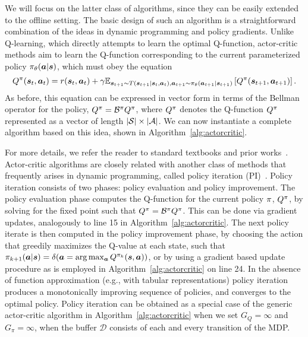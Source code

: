 \documentclass[../thesis.tex]{subfiles}
\begin{document}
We will focus on the latter class of algorithms, since they can be easily extended to the offline setting. The basic design of such an algorithm is a straightforward combination of the ideas in dynamic programming and policy gradients. Unlike Q-learning, which directly attempts to learn the optimal Q-function, actor-critic methods aim to learn the Q-function corresponding to the current parameterized policy $\pi_\theta(\boldsymbol{a} | \boldsymbol{s})$, which must obey the equation
\[
Q^\pi(\boldsymbol{s}_t, \boldsymbol{a}_t) = r(\boldsymbol{s}_t,\boldsymbol{a}_t) + \gamma \mathbb{E}_{\boldsymbol{s}_{t+1} \sim T(\boldsymbol{s}_{t+1}|\boldsymbol{s}_t,\boldsymbol{a}_t), \boldsymbol{a}_{t+1} \sim \pi_\theta(\boldsymbol{a}_{t+1} | \boldsymbol{s}_{t+1})}\left[
Q^\pi(\boldsymbol{s}_{t+1},\boldsymbol{a}_{t+1})
\right].
\]
As before, this equation can be expressed in vector form in terms of the Bellman operator for the policy, ${Q}^\pi = \mathcal{B}^\pi {Q}^\pi$, where ${Q}^\pi$ denotes the Q-function $Q^\pi$ represented as a vector of length $|\mathcal{S}|\times |\mathcal{A}|$. We can now instantiate a complete algorithm based on this idea, shown in Algorithm~\ref{alg:actorcritic}.

For more details, we refer the reader to standard textbooks and prior works~\citep{sb-irl-98,konda2000actor}.
Actor-critic algorithms are closely related with another class of methods that frequently arises in dynamic programming, called policy iteration (PI)~\citep{lagoudakis2003least}. Policy iteration consists of two phases: policy evaluation and policy improvement. The policy evaluation phase computes the Q-function for the current policy $\pi$, $Q^\pi$, by solving for the fixed point such that $Q^\pi = \mathcal{B}^\pi Q^\pi$. This can be done via gradient updates, analogously to line 15 in Algorithm~\ref{alg:actorcritic}. The next policy iterate is then computed in the policy improvement phase, by choosing the action that greedily maximizes the Q-value at each state, such that $\pi_{k+1}(\boldsymbol{a}|\boldsymbol{s}) = \delta(\boldsymbol{a} = \arg\max_{\boldsymbol{a}} Q^{\pi_k}(\boldsymbol{s},\boldsymbol{a}))$, or by using a gradient based update procedure as is employed in Algorithm~\ref{alg:actorcritic} on line 24. In the absence of function approximation (e.g., with tabular representations) policy iteration produces a monotonically improving sequence of policies, and converges to the optimal policy. Policy iteration can be obtained as a special case of the generic actor-critic algorithm in Algorithm~\ref{alg:actorcritic} when we set $G_Q = \infty$ and $G_\pi = \infty$, when the buffer $\mathcal{D}$ consists of each and every transition of the MDP.
\end{document}

